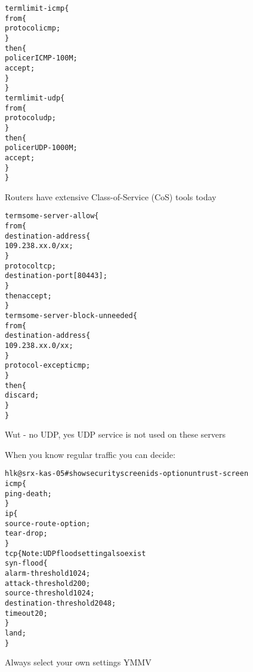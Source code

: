 \documentclass[Screen16to9,17pt]{foils}
\begin{document}
\begin{alltt}\footnotesize
term limit-icmp \{
    from \{
        protocol icmp;
    \}
    then \{
        policer ICMP-100M;
        accept;
    \}
\}
term limit-udp \{
    from \{
        protocol udp;
    \}
    then \{
        policer UDP-1000M;
        accept;
    \}
\}
\end{alltt}

Routers have extensive Class-of-Service (CoS) tools today


\begin{alltt}\footnotesize
term some-server-allow \{
    from \{
        destination-address \{
            109.238.xx.0/xx;
        \}
        protocol tcp;
        destination-port [ 80 443 ];
    \}
    then accept;
\}
term some-server-block-unneeded \{
    from \{
        destination-address \{
            109.238.xx.0/xx;
        \}
        protocol-except icmp;
    \}
    then \{
        discard;
    \}
\}
\end{alltt}

Wut - no UDP, yes UDP service is not used on these servers



When you know regular traffic you can decide:

\begin{alltt}\footnotesize
hlk@srx-kas-05# show security screen ids-option untrust-screen
icmp \{
    ping-death;
\}
ip \{
    source-route-option;
    tear-drop;
\}
tcp \{    Note: UDP flood setting also exist
    syn-flood \{
        alarm-threshold 1024;
        attack-threshold 200;
        source-threshold 1024;
        destination-threshold 2048;
        timeout 20;
    \}
    land;
\}
\end{alltt}

Always select your own settings YMMV
\end{document}
